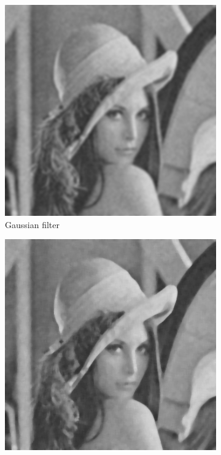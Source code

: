 \begin{figure}[H]
\hspace*{\fill} %
\begin{subfigure}{0.31\textwidth}
\includegraphics[width=\linewidth]{img/denoise_gauss.png}
\caption{Gaussian filter} \label{fig:1a}
\end{subfigure}
\hspace*{\fill} %
\begin{subfigure}{0.31\textwidth}
\includegraphics[width=\linewidth]{img/denoise_median.png}

\end{subfigure}
\end{figure}
